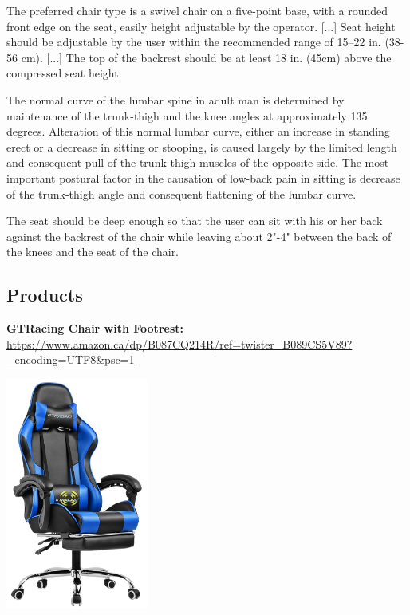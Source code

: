 \documentclass[11pt]{article}
\begin{document}
    \cite{seating-viewing-considerations} The preferred chair type is a swivel chair on a five-point
    base, with a rounded front edge on the seat, easily height adjustable by the operator. [...]
    Seat height should be adjustable by the
    user within the recommended range of 15–22 in. (38-56 cm). [...]
    The top of the backrest should be at least 18 in. (45cm) above the compressed seat height. 
    

    \cite{keegan1953alterations} The normal curve of the lumbar spine in adult man is determined by maintenance of the trunk-thigh and the knee angles at approximately 135 degrees. Alteration of this normal lumbar curve, either an increase in standing erect or a decrease in sitting or stooping, is caused largely by the limited length and consequent pull of the trunk-thigh muscles of the opposite side. The most important postural factor in the causation of low-back pain in sitting is decrease of the trunk-thigh angle and consequent flattening of the lumbar curve.

    \cite{howe_2016} The seat should be deep enough so that the user can sit with his or her back against the backrest of the chair while leaving about 2"-4" between the back of the knees and the seat of the chair.

    \newpage
    \subsection{Products}
    \textbf{GTRacing Chair with Footrest:} \url{https://www.amazon.ca/dp/B087CQ214R/ref=twister_B089CS5V89?_encoding=UTF8&psc=1}
    \begin{center}
    \includegraphics[height = 3in]{GTRacingChair.PNG}
    \end{center}
\end{document}
